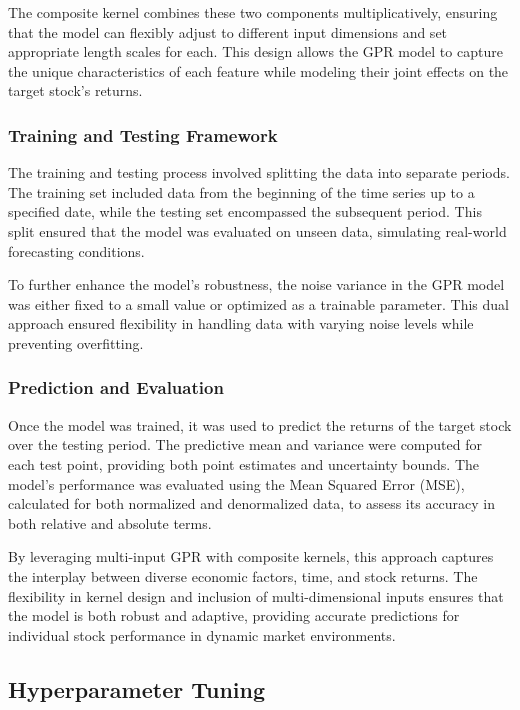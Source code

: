 The composite kernel combines these two components multiplicatively, ensuring that the model can flexibly adjust to different input dimensions and set appropriate length scales for each. This design allows the GPR model to capture the unique characteristics of each feature while modeling their joint effects on the target stock's returns.

\subsubsection{Training and Testing Framework}

The training and testing process involved splitting the data into separate periods. The training set included data from the beginning of the time series up to a specified date, while the testing set encompassed the subsequent period. This split ensured that the model was evaluated on unseen data, simulating real-world forecasting conditions.

To further enhance the model's robustness, the noise variance in the GPR model was either fixed to a small value or optimized as a trainable parameter. This dual approach ensured flexibility in handling data with varying noise levels while preventing overfitting.

\subsubsection{Prediction and Evaluation}

Once the model was trained, it was used to predict the returns of the target stock over the testing period. The predictive mean and variance were computed for each test point, providing both point estimates and uncertainty bounds. The model's performance was evaluated using the Mean Squared Error (MSE), calculated for both normalized and denormalized data, to assess its accuracy in both relative and absolute terms.

By leveraging multi-input GPR with composite kernels, this approach captures the interplay between diverse economic factors, time, and stock returns. The flexibility in kernel design and inclusion of multi-dimensional inputs ensures that the model is both robust and adaptive, providing accurate predictions for individual stock performance in dynamic market environments.

\subsection{Hyperparameter Tuning}

